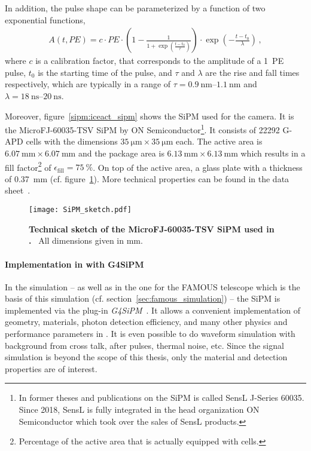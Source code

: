 In addition, the pulse shape can be parameterized by a function of two exponential functions,
\begin{align}
	A(t,PE) = c\cdot PE \cdot \left(1-\frac{1}{1+\exp\left(\frac{t-t_0}{\tau}\right)}\right)\cdot\exp\left(-\frac{t-t_0}{\lambda}\right)\,,
\end{align}
where $c$ is a calibration factor, that corresponds to the amplitude of a \SI{1}{PE} pulse, $t_0$ is the starting time of the pulse, and $\tau$ and $\lambda$ are the rise and fall times respectively, which are typically in a range of $\tau=\SIrange{0.9}{1.1}{\nano\meter}$ and $\lambda=\SIrange{18}{20}{\nano\second}$.~\cite{sipm:fact_calibration}

Moreover, figure~\ref{sipm:iceact_sipm} shows the SiPM used for the \iceact camera. It is the MicroFJ-60035-TSV SiPM by ON Semiconductor\footnote{In former theses and publications on \iceact the SiPM is called SensL J-Series 60035. Since 2018, SensL is fully integrated in the head organization ON Semiconductor which took over the sales of SensL products.}. 
It consists of \num{22292} G-APD cells with the dimensions $\SI{35}{\micro\meter}\times\SI{35}{\micro\meter}$ each. The active area is $\SI{6.07}{\milli\meter}\times\SI{6.07}{\milli\meter}$ and the package area is $\SI{6.13}{\milli\meter}\times\SI{6.13}{\milli\meter}$ which results in a fill factor\footnote{Percentage of the active area that is actually equipped with cells.} of $\epsilon_\text{fill}=\SI{75}{\percent}$. On top of the active area, a glass plate with a thickness of \SI{0.37}{\milli\meter} (cf. figure~\ref{sipm:tec_sketch}). More technical properties can be found in the data sheet~\cite{sipm:datasheet}.

\begin{figure}[H]
	\centering
	\texttt{[image: SiPM\_sketch.pdf]}
	\caption[Technical sketch of the MicroFJ-60035-TSV SiPM used in \iceact]{\textbf{Technical sketch of the MicroFJ-60035-TSV SiPM used in \iceact.}~\cite{sipm:datasheet} All dimensions given in \si{\milli\meter}.}
	\label{sipm:tec_sketch}	
\end{figure}

\paragraph{Implementation in \geant with G4SiPM}

In the \iceact \geant simulation -- as well as in the one for the FAMOUS telescope which is the basis of this simulation (cf. section~\ref{sec:famous_simulation}) -- the SiPM is implemented via the plug-in \textit{G4SiPM}~\cite{sipm:g4sipm}. It allows a convenient implementation of geometry, materials, photon detection efficiency, and many other physics and performance parameters in \geant. It is even possible to do waveform simulation with background from cross talk, after pulses, thermal noise, etc. Since the signal simulation is beyond the scope of this thesis, only the material and detection properties are of interest.

